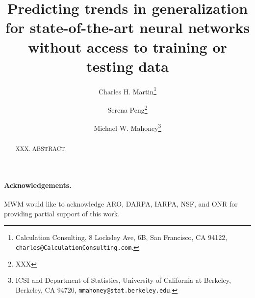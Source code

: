 \documentclass[11pt]{article}
\begin{document}
\title{%
Predicting trends in generalization for state-of-the-art neural networks without access to training or testing data
}

\author{%
Charles H. Martin\thanks{Calculation Consulting, 8 Locksley Ave, 6B, San Francisco, CA 94122, \texttt{charles@CalculationConsulting.com}.} 
\and 
Serena Peng\thanks{XXX}
\and
Michael W. Mahoney\thanks{ICSI and Department of Statistics, University of California at Berkeley, Berkeley, CA 94720, \texttt{mmahoney@stat.berkeley.edu}.}
}

\date{}
\maketitle


\begin{abstract}
XXX.  ABSTRACT.
\end{abstract}









\noindent
\paragraph{Acknowledgements.}
MWM would like to acknowledge ARO, DARPA, IARPA, NSF, and ONR for providing partial support of this work.


%
{\small
%
%

}
\end{document}
